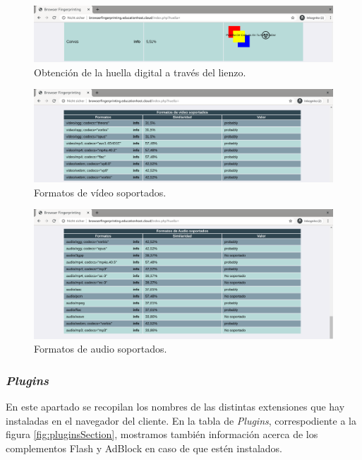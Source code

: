 \begin{figure}[tbp]
	\centering
	\includegraphics[width=1\textwidth]{Images/canvas.png}
	\caption{Obtención de la huella digital a través del lienzo.}
	\label{fig:canvas.png}
\end{figure}

\begin{figure}[tbp]
	\centering
	\includegraphics[width=1\textwidth]{Images/videosSection.png}
	\caption{Formatos de vídeo soportados.}
	\label{fig:videosSection}
\end{figure}

\begin{figure}[tbp]
	\centering
	\includegraphics[width=1\textwidth]{Images/audiosSection.png}
	\caption{Formatos de audio soportados.}
	\label{fig:audiosSection}
\end{figure}

\subsubsection{\textit{Plugins}}
En este apartado se recopilan los nombres de las distintas extensiones que hay instaladas en el navegador del cliente. En la tabla de \textit{Plugins}, correspodiente a la figura \ref{fig:pluginsSection}, mostramos también información acerca de los complementos Flash y AdBlock en caso de que estén instalados.

